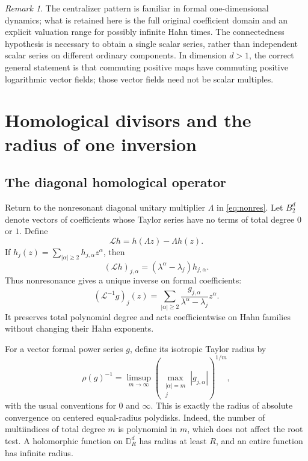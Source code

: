 \documentclass[11pt,letterpaper]{article}
\theoremstyle{definition}
\theoremstyle{remark}
\newtheorem{remark}[remark]{Remark}
\newcommand{\DR}{\mathbb D_R^d}
\newcommand{\Li}{\mathcal L}
\numberwithin{equation}{section}
\begin{document}
\begin{remark}
The centralizer pattern is familiar in formal one-dimensional dynamics;
what is retained here is the full original coefficient domain and an explicit
valuation range for possibly infinite Hahn times. The connectedness
hypothesis is necessary to obtain a single scalar series, rather than
independent scalar series on different ordinary components. In dimension
$d>1$, the correct general statement is that commuting positive maps have
commuting positive logarithmic vector fields; those vector fields need not
be scalar multiples.
\end{remark}

\section{Homological divisors and the radius of one inversion}
\label{sec:homological}

\subsection{The diagonal homological operator}
Return to the nonresonant diagonal unitary multiplier $\Lambda$ in
\eqref{eq:nonres}. Let $B_2^d$ denote vectors of coefficients whose Taylor
series have no terms of total degree $0$ or $1$. Define
\begin{equation}\label{eq:homological}
 \Li h=h(\Lambda z)-\Lambda h(z).
\end{equation}
If $h_j(z)=\sum_{|\alpha|\ge2}h_{j,\alpha}z^\alpha$, then
\[
 (\Li h)_{j,\alpha}=(\lambda^\alpha-\lambda_j)h_{j,\alpha}.
\]
Thus nonresonance gives a unique inverse on formal coefficients:
\begin{equation}\label{eq:Linverse}
 (\Li^{-1}g)_j(z)=
 \sum_{|\alpha|\ge2}\frac{g_{j,\alpha}}
                         {\lambda^\alpha-\lambda_j}z^\alpha.
\end{equation}
It preserves total polynomial degree and acts coefficientwise on Hahn
families without changing their Hahn exponents.

For a vector formal power series $g$, define its isotropic Taylor radius by
\begin{equation}\label{eq:radius}
 \rho(g)^{-1}=
 \limsup_{m\to\infty}
       \left(\max_{\substack{|\alpha|=m\\j}}|g_{j,\alpha}|\right)^{1/m},
\end{equation}
with the usual conventions for $0$ and $\infty$. This is exactly the
radius of absolute convergence on centered equal-radius polydisks. Indeed,
the number of multiindices of total degree $m$ is polynomial in $m$, which
does not affect the root test. A holomorphic function on $\DR$ has radius
at least $R$, and an entire function has infinite radius.
\end{document}
